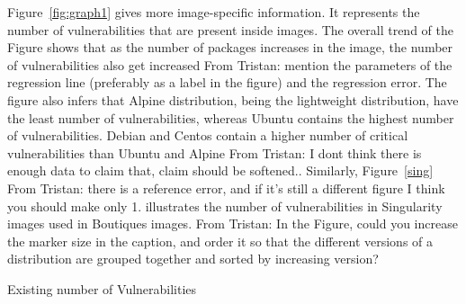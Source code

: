 \documentclass[a4paper,num-refs]{oup-contemporary}
\newcommand{\tristan}[1]{\color{blue}From Tristan: #1\color{black}}
\begin{document}
Figure~\ref{fig:graph1} gives more image-specific information.
It represents the number of vulnerabilities that are present inside images.
The overall trend of the Figure shows that as the number of packages increases in the image, the number of vulnerabilities
also get increased \tristan{mention the parameters of the regression line (preferably as a label in the figure) and the regression error}.
The figure also infers that Alpine distribution, being the
lightweight distribution, have the least number of vulnerabilities, whereas Ubuntu contains the highest number of
vulnerabilities. Debian and Centos contain a higher number of critical vulnerabilities than Ubuntu and Alpine \tristan{I dont think there is enough data to 
claim that, claim should be softened.}.
Similarly, Figure~\ref{sing} \tristan{there is a reference error, and if it's still a different figure I think you should make only 1.} illustrates the number of vulnerabilities in Singularity images used in Boutiques images.
\tristan{In the Figure, could you increase the marker size in the caption, and order it so that the different versions of a distribution 
are grouped together and sorted by increasing version?}
\begin{table}
%
       \centering
	\caption{\label{table1}Existing number of Vulnerabilities}
\end{table}
\end{document}
